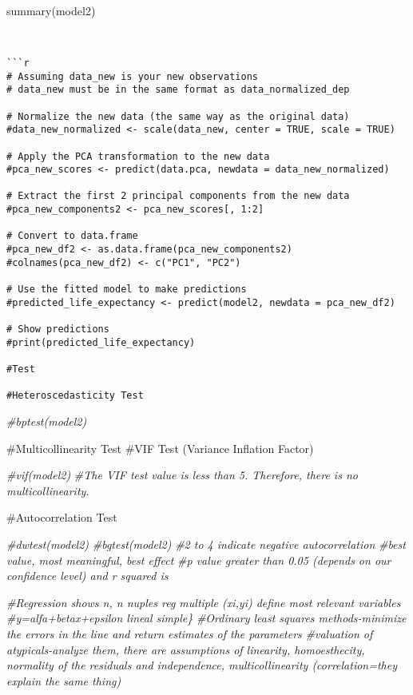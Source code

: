 \documentclass[
]{article}
\newenvironment{Shaded}{\begin{snugshade}}{\end{snugshade}}
\newcommand{\CommentTok}[1]{\textcolor[rgb]{0.56,0.35,0.01}{\textit{#1}}}
\begin{document}
summary(model2)

\begin{verbatim}


```r
# Assuming data_new is your new observations
# data_new must be in the same format as data_normalized_dep

# Normalize the new data (the same way as the original data)
#data_new_normalized <- scale(data_new, center = TRUE, scale = TRUE)

# Apply the PCA transformation to the new data
#pca_new_scores <- predict(data.pca, newdata = data_new_normalized)

# Extract the first 2 principal components from the new data
#pca_new_components2 <- pca_new_scores[, 1:2]

# Convert to data.frame
#pca_new_df2 <- as.data.frame(pca_new_components2)
#colnames(pca_new_df2) <- c("PC1", "PC2")

# Use the fitted model to make predictions
#predicted_life_expectancy <- predict(model2, newdata = pca_new_df2)

# Show predictions
#print(predicted_life_expectancy)

#Test

#Heteroscedasticity Test
\end{verbatim}

\begin{Shaded}
\begin{Highlighting}[]
\CommentTok{\#bptest(model2)}
\end{Highlighting}
\end{Shaded}

\#Multicollinearity Test \#VIF Test (Variance Inflation Factor)

\begin{Shaded}
\begin{Highlighting}[]
\CommentTok{\#vif(model2)}
\CommentTok{\#The VIF test value is less than 5. Therefore, there is no multicollinearity.}
\end{Highlighting}
\end{Shaded}

\#Autocorrelation Test

\begin{Shaded}
\begin{Highlighting}[]
\CommentTok{\#dwtest(model2)}
\CommentTok{\#bgtest(model2)}
\CommentTok{\#2 to 4 indicate negative autocorrelation}
\CommentTok{\#best value, most meaningful, best effect}
\CommentTok{\#p value greater than 0.05 (depends on our confidence level) and r squared is}

\CommentTok{\#Regression shows n, n nuples reg multiple (xi,yi) define most relevant variables}
\CommentTok{\#y=alfa+betax+epsilon lineal simple\}}
\CommentTok{\#Ordinary least squares methods{-}minimize the errors in the line and return estimates of the parameters}
\CommentTok{\#valuation of atypicals{-}analyze them, there are assumptions of linearity, homoesthecity, normality of the residuals and independence, multicollinearity (correlation=they explain the same thing)}
\end{Highlighting}
\end{Shaded}
\end{document}
